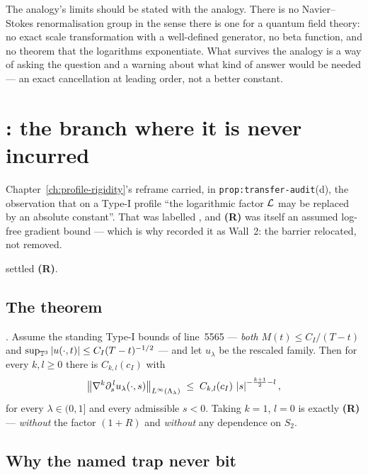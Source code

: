 The analogy's limits should be stated with the analogy. There is no
Navier--Stokes renormalisation group in the sense there is one for a
quantum field theory: no exact scale transformation with a well-defined
generator, no beta function, and no theorem that the logarithms exponentiate.
What survives the analogy is a way of asking the question and a warning about
what kind of answer would be needed --- an exact cancellation at leading
order, not a better constant.

\section{\texorpdfstring{: the branch where it is never incurred}{S48: the branch where it is never incurred}}
\label{sec:s48-R}

Chapter~\ref{ch:profile-rigidity}'s  reframe carried, in
\texttt{prop:transfer-audit}(d), the observation that on a Type-I profile
``the logarithmic factor \(\mathcal{L}\) may be replaced by an absolute constant''.
That was labelled , and \textbf{(R)} was itself an assumed
log-free gradient bound --- which is why  recorded it as Wall~2: the
barrier relocated, not removed.

 settled \textbf{(R)}.

\subsection{The theorem}

\begin{statement}
\label{st:s48R}
\PROVED{}. Assume the standing Type-I bounds of line~5565 --- \emph{both}
\(M(t)\le C_I/(T-t)\) and \(\sup_{\mathbb{T}^3}\left|u(\cdot,t)\right|\le C_I(T-t)^{-1/2}\)
--- and let \(u_\lambda\) be the rescaled family. Then for every
\(k,l\ge0\) there is \(C_{k,l}(c_I)\) with
\[
  \left\|\nabla^k\partial_s^{\,l}u_\lambda(\cdot,s)\right\|_{L^\infty(\Lambda_\lambda)}
  \;\le\; C_{k,l}(c_I)\,\left|s\right|^{-\frac{k+1}{2}-l},
\]
for every \(\lambda\in(0,1]\) and every admissible \(s<0\). Taking \(k=1\),
\(l=0\) is exactly \textbf{(R)} --- \emph{without} the factor \((1+R)\) and
\emph{without} any dependence on \(S_2\).
\end{statement}

\subsection{Why the named trap never bit}

